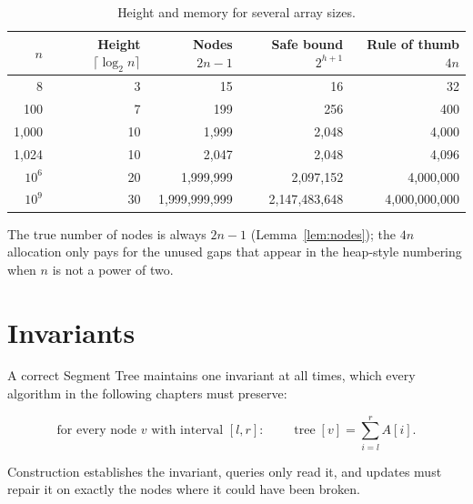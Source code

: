 \documentclass[
  11pt,
  a4paper,
  twoside=false,
  numbers=noenddot,
  headings=big,
  parskip=half,
  toc=bibliography,
  toc=listof,
  bibliography=totoc
]{scrreprt}
\newcommand{\tblhead}[1]{\textbf{\sffamily #1}}
\begin{document}
\begin{table}[h]
\centering
\caption{Height and memory for several array sizes.}
\label{tab:heights}
\begin{tabular}{rrrrr}
\toprule
\tblhead{$n$} & \tblhead{Height $\lceil\log_2 n\rceil$} & \tblhead{Nodes $2n-1$} & \tblhead{Safe bound $2^{h+1}$} & \tblhead{Rule of thumb $4n$} \\
\midrule
8              & 3  & 15              & 16              & 32 \\
100            & 7  & 199             & 256             & 400 \\
1{,}000        & 10 & 1{,}999         & 2{,}048         & 4{,}000 \\
1{,}024        & 10 & 2{,}047         & 2{,}048         & 4{,}096 \\
$10^6$         & 20 & 1{,}999{,}999   & 2{,}097{,}152   & 4{,}000{,}000 \\
$10^9$         & 30 & 1{,}999{,}999{,}999 & 2{,}147{,}483{,}648 & 4{,}000{,}000{,}000 \\
\bottomrule
\end{tabular}
\end{table}

\begin{remark}
The true number of nodes is always $2n-1$ (Lemma~\ref{lem:nodes}); the $4n$ allocation only pays for the unused gaps that appear in the heap-style numbering when $n$ is not a power of two.
\end{remark}

\section{Invariants}
A correct Segment Tree maintains one invariant at all times, which every algorithm in the following chapters must preserve:

\begin{equation}
\text{for every node } v \text{ with interval } [l,r]:\qquad \operatorname{tree}[v] = \sum_{i=l}^{r}A[i].
\label{eq:invariant}
\end{equation}

Construction establishes the invariant, queries only read it, and updates must repair it on exactly the nodes where it could have been broken.
\end{document}
